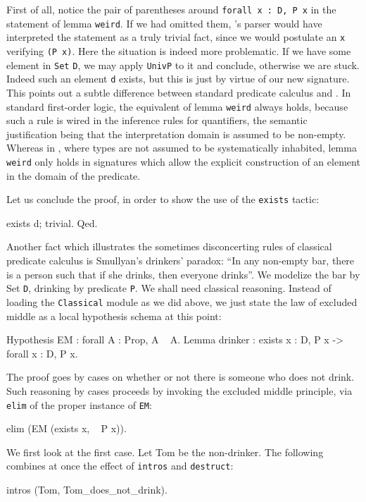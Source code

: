 \documentclass[11pt,a4paper]{book}
\begin{document}
First of all, notice the pair of parentheses around
\verb+forall x : D, P x+ in
the statement of lemma \verb:weird:.
If we had omitted them, \Coq's parser would have interpreted the
statement as a truly trivial fact, since we would
postulate an \verb:x: verifying \verb:(P x):. Here the situation is indeed
more problematic. If we have some element in \verb:Set: \verb:D:, we may
apply \verb:UnivP: to it and conclude, otherwise we are stuck. Indeed
such an element \verb:d: exists, but this is just by virtue of our
new signature. This points out a subtle difference between standard
predicate calculus and \Coq. In standard first-order logic,
the equivalent of lemma \verb:weird: always holds,
because such a rule is wired in the inference rules for quantifiers, the
semantic justification being that the interpretation domain is assumed to
be non-empty. Whereas in \Coq, where types are not assumed to be
systematically inhabited, lemma \verb:weird: only holds in signatures
which allow the explicit construction of an element in the domain of
the predicate.

Let us conclude the proof, in order to show the use of the \verb:exists:
tactic:
\begin{coq_example}
exists d; trivial.
Qed.
\end{coq_example}

Another fact which illustrates the sometimes disconcerting rules of
classical
predicate calculus is Smullyan's drinkers' paradox: ``In any non-empty
bar, there is a person such that if she drinks, then everyone drinks''.
We modelize the bar by Set \verb:D:, drinking by predicate \verb:P:.
We shall need classical reasoning. Instead of loading the \verb:Classical:
module as we did above, we just state the law of excluded middle as a
local hypothesis schema at this point:
\begin{coq_example}
Hypothesis EM : forall A : Prop, A \/ ~ A.
Lemma drinker :  exists x : D, P x -> forall x : D, P x.
\end{coq_example}
The proof goes by cases on whether or not
there is someone who does not drink. Such reasoning by cases proceeds
by invoking the excluded middle principle, via \verb:elim: of the
proper instance of \verb:EM::
\begin{coq_example}
elim (EM (exists x, ~ P x)).
\end{coq_example}

We first look at the first case. Let Tom be the non-drinker.
The following combines at once the effect of \verb:intros: and
\verb:destruct::
\begin{coq_example}
intros (Tom, Tom_does_not_drink).
\end{coq_example}
\end{document}
